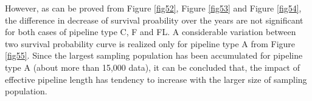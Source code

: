 \documentclass[a4paper,oneside,onecolumn,preprint,10pt,authoryear]{elsarticle}
\begin{document}
However, as can be proved from Figure \ref{fig52}, Figure \ref{fig53} and Figure \ref{fig54}, the difference in decrease of survival proability over the years are not significant for both cases of pipeline type C, F and FL. A considerable variation between two survival probability curve is realized only for pipeline type A from Figure \ref{fig55}. Since the largest sampling population has been accumulated for pipeline type A (about more than 15,000 data), it can be concluded that, the impact of effective pipeline length has tendency to increase with the larger size of sampling population. 
\end{document}
